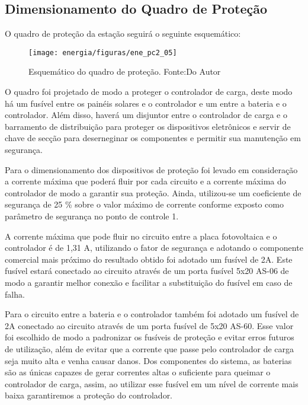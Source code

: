 \subsection{Dimensionamento do Quadro de Proteção}

O quadro de proteção da estação seguirá o seguinte esquemático:

\begin{figure}[H]
		\centering
		\texttt{[image: energia/figuras/ene\_pc2\_05]}
		\caption{Esquemático do quadro de proteção. Fonte:Do Autor}
		\label{ene_pc2_05}
\end{figure}

O quadro foi projetado de modo a proteger o controlador de carga, deste modo há um fusível entre os painéis solares e o controlador e um entre a bateria e o controlador. Além disso, haverá um disjuntor entre o controlador de carga e o barramento de distribuição para proteger os dispositivos eletrônicos e servir de chave de secção para deserneginar os componentes e permitir sua manutenção em segurança.

Para o dimensionamento dos dispositivos de proteção foi levado em consideração a corrente máxima que poderá fluir por cada circuito e a corrente máxima do controlador de modo a garantir sua proteção. Ainda, utilizou-se um coeficiente de segurança de 25 \% sobre o valor máximo de corrente conforme exposto como parâmetro de segurança no ponto de controle 1.

A corrente máxima que pode fluir no circuito entre a placa fotovoltaica e o controlador é de 1,31 A, utilizando o fator de segurança e adotando o componente comercial mais próximo do resultado obtido foi adotado um fusível de 2A. Este fusível estará conectado ao circuito através de um porta fusível 5x20 AS-06 de modo a garantir melhor conexão e facilitar a substituição do fusível em caso de falha.

Para o circuito entre a bateria e o controlador também foi adotado um fusível de 2A conectado ao circuito através de um porta fusível de 5x20 AS-60. Esse valor foi escolhido de modo a padronizar os fusíveis de proteção e evitar erros futuros de utilização, além de evitar que a corrente que passe pelo controlador de carga seja muito alta e venha causar danos. Dos componentes do sistema, as baterias são as únicas capazes de gerar correntes altas o suficiente para queimar o controlador de carga, assim, ao utilizar esse fusível em um nível de corrente mais baixa garantiremos a proteção do controlador.

